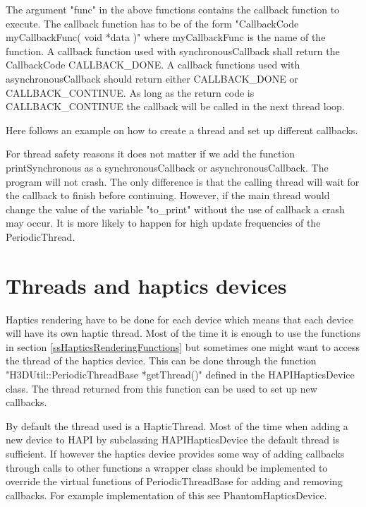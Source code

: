 The argument "func" in the above functions contains the callback function to
execute. The callback function has to be of the form
"CallbackCode myCallbackFunc( void *data )" where myCallbackFunc is the name of
the function. A callback function used with synchronousCallback shall
return the CallbackCode CALLBACK\_DONE. A callback functions used with
asynchronousCallback should return either CALLBACK\_DONE or CALLBACK\_CONTINUE.
As long as the return code is CALLBACK\_CONTINUE the callback will be called in
the next thread loop.

Here follows an example on how to create a thread and set up different
callbacks.



For thread safety reasons it does not matter if we add the function
printSynchronous as a synchronousCallback or asynchronousCallback. The program
will not crash. The only difference is that the calling thread will wait for
the callback to finish before continuing. However, if the main thread would
change the value of the variable "to\_print" without the use of callback a
crash may occur. It is more likely to happen for high update frequencies of the
PeriodicThread.

\section{Threads and haptics devices}
Haptics rendering have to be done for each device which means that each device
will have its own haptic thread. Most of the time it is enough to use the
functions in section \ref{ssHapticsRenderingFunctions} but sometimes one might
want to access the thread of the haptics device. This can be done through the
function "H3DUtil::PeriodicThreadBase *getThread()" defined in the
HAPIHapticsDevice class. The thread returned from this function can be used
to set up new callbacks.

By default the thread used is a HapticThread. Most of the time when adding a
new device to HAPI by subclassing HAPIHapticsDevice the default thread is
sufficient. If however the haptics device provides some way of adding callbacks
through calls to other functions a wrapper class should be implemented
to override the virtual functions of PeriodicThreadBase for adding and removing
callbacks. For example implementation of this see PhantomHapticsDevice.